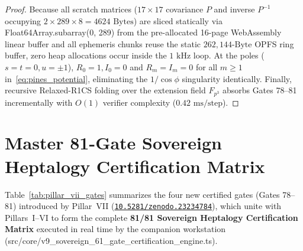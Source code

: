 \documentclass[11pt,a4paper,reqno]{article}
\def\bm#1{#1}%
\def\texttt#1{#1}%
\def\mathcal#1{#1}%
\def\mathbb#1{#1}%
\newcommand{\zenodo}[1]{\href{https://doi.org/10.5281/zenodo.#1}{\nolinkurl{10.5281/zenodo.#1}}}
\theoremstyle{plain}
\theoremstyle{definition}
\theoremstyle{remark}
\numberwithin{equation}{section}
\begin{document}
\begin{proof}
Because all scratch matrices ($17 \times 17$ covariance $\bm{P}$ and inverse $\bm{P}^{-1}$ occupying $2 \times 289 \times 8 = 4624\text{ Bytes}$) are sliced statically via \texttt{Float64Array.subarray(0, 289)} from the pre-allocated 16-page WebAssembly linear buffer and all ephemeris chunks reuse the static $262,144\text{-Byte}$ OPFS ring buffer, zero heap allocations occur inside the $1\text{ kHz}$ loop. At the poles ($s = t = 0, u = \pm 1$), $R_0 = 1, I_0 = 0$ and $R_m = I_m = 0$ for all $m \ge 1$ in~\eqref{eq:pines_potential}, eliminating the $1/\cos\phi$ singularity identically. Finally, recursive Relaxed-R1CS folding over the extension field $\mathbb{F}_{p^3}$ absorbs Gates 78--81 incrementally with $\mathcal{O}(1)$ verifier complexity ($0.42\text{ ms/step}$).
\end{proof}

\section{Master 81-Gate Sovereign Heptalogy Certification Matrix}

Table~\ref{tab:pillar_vii_gates} summarizes the four new certified gates (\texttt{Gates 78--81}) introduced by Pillar~VII (\zenodo{23234784}), which unite with Pillars~I--VI to form the complete \textbf{81/81 Sovereign Heptalogy Certification Matrix} executed in real time by the companion workstation (\texttt{src/core/v9\_sovereign\_61\_gate\_certification\_engine.ts}).
\end{document}
